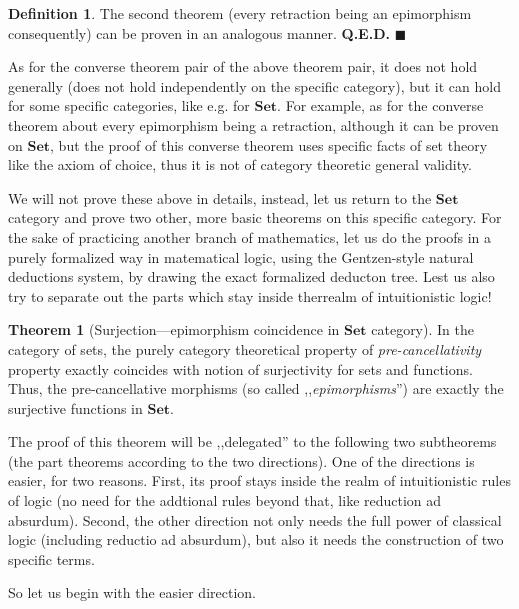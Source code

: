\documentclass{article}
\newcommand{\setCat}{\mathbf{Set}}
\theoremstyle{definition}
\newtheorem{thm}{Theorem}
\newtheorem{dfn}{Definition}
\renewcommand{\qedsymbol}{\textbf{Q.E.D.} $\blacksquare$}
\begin{document}
\begin{dfn}
		The second theorem (every retraction being an epimorphism consequently) can be proven in an analogous manner. \qedsymbol

		As for the converse theorem pair of the above theorem pair, it does not hold generally (does not hold independently on the specific category), but it can hold for some specific categories, like e.g. for $\setCat$. For example, as for the converse theorem about every epimorphism being a retraction, although it can be proven on $\setCat$, but the proof of this converse theorem uses specific facts of set theory like the axiom of choice, thus it is not of category theoretic general validity.
	\end{dfn}

	We will not prove these above in details, instead, let us return to the $\setCat$ category and prove two other, more basic theorems on this specific category.
	For the sake of practicing another branch of mathematics, let us do the proofs in a purely formalized way in matematical logic, using the Gentzen-style natural deductions system, by drawing the exact formalized deducton tree. Lest us also try to separate out the parts which stay inside therrealm of intuitionistic logic!

	\begin{thm}[Surjection---epimorphism coincidence in $\setCat$ category]
		In the category of sets, the purely category theoretical property of \emph{pre-cancellativity} property exactly coincides with notion of surjectivity for sets and functions.
		Thus, the pre-cancellative morphisms (so called ,,\emph{epimorphisms}'') are exactly the surjective functions in $\mathbf{Set}$.
	\end{thm}

		The proof of this theorem will be ,,delegated'' to the following two sub\-theorems (the part theorems according to the two directions).
		One of the directions is easier, for two reasons. First, its proof stays inside the realm of intuitionistic rules of logic (no need for the addtional rules beyond that, like reduction ad absurdum). Second, the other direction not only needs the full power of classical logic (including reductio ad absurdum), but also it needs the construction of two specific terms.

		So let us begin with the easier direction.
\end{document}
